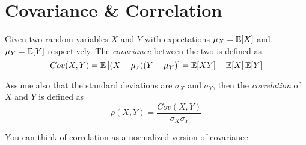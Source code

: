 \section{Covariance \& Correlation}
Given two random variables $X$ and $Y$ with expectations 
$\mu_X = \operatorname{\mathbb{E}}[X]$ and $\mu_Y=\operatorname{\mathbb{E}}[Y]$ respectively. 
The \emph{covariance} between the two is defined as
\[Cov(X,Y) = \operatorname{\mathbb{E}}\left[(X-\mu_x)(Y-\mu_Y)\right]=\operatorname{\mathbb{E}}[XY]-\operatorname{\mathbb{E}}[X]\operatorname{\mathbb{E}}[Y]\]

Assume also that the standard deviations are $\sigma_X$ and $\sigma_Y$, 
then the \emph{correlation} of $X$ and $Y$ is defined as 
\[\rho(X,Y) = \frac{Cov(X,Y)}{\sigma_X\sigma_Y}\]

You can think of correlation as a normalized version of covariance. 

